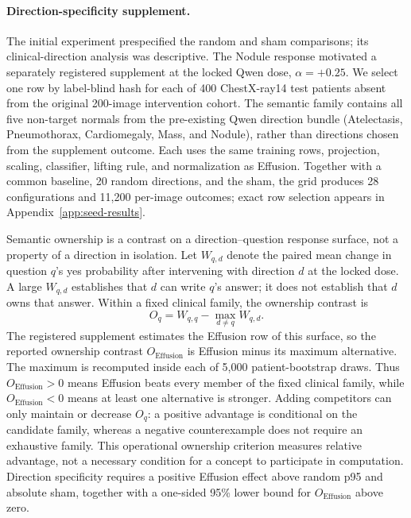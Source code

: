 \paragraph{Direction-specificity supplement.}
The initial experiment prespecified the random and sham comparisons; its clinical-direction analysis was descriptive. The Nodule response motivated a separately registered supplement at the locked Qwen dose, $\alpha=+0.25$. We select one row by label-blind hash for each of 400 ChestX-ray14 test patients absent from the original 200-image intervention cohort. The semantic family contains all five non-target normals from the pre-existing Qwen direction bundle (Atelectasis, Pneumothorax, Cardiomegaly, Mass, and Nodule), rather than directions chosen from the supplement outcome. Each uses the same training rows, projection, scaling, classifier, lifting rule, and normalization as Effusion. Together with a common baseline, 20 random directions, and the sham, the grid produces 28 configurations and 11,200 per-image outcomes; exact row selection appears in Appendix~\ref{app:seed-results}.

Semantic ownership is a contrast on a direction--question response surface, not a property of a direction in isolation. Let $W_{q,d}$ denote the paired mean change in question $q$'s yes probability after intervening with direction $d$ at the locked dose. A large $W_{q,d}$ establishes that $d$ can write $q$'s answer; it does not establish that $d$ owns that answer. Within a fixed clinical family, the ownership contrast is
\begin{equation}
O_q=W_{q,q}-\max_{d\neq q}W_{q,d}.
\label{eq:seed-margin}
\end{equation}
The registered supplement estimates the Effusion row of this surface, so the reported ownership contrast $O_{\mathrm{Effusion}}$ is Effusion minus its maximum alternative. The maximum is recomputed inside each of 5,000 patient-bootstrap draws. Thus $O_{\mathrm{Effusion}}>0$ means Effusion beats every member of the fixed clinical family, while $O_{\mathrm{Effusion}}<0$ means at least one alternative is stronger. Adding competitors can only maintain or decrease $O_q$: a positive advantage is conditional on the candidate family, whereas a negative counterexample does not require an exhaustive family. This operational ownership criterion measures relative advantage, not a necessary condition for a concept to participate in computation. Direction specificity requires a positive Effusion effect above random p95 and absolute sham, together with a one-sided 95\% lower bound for $O_{\mathrm{Effusion}}$ above zero.

